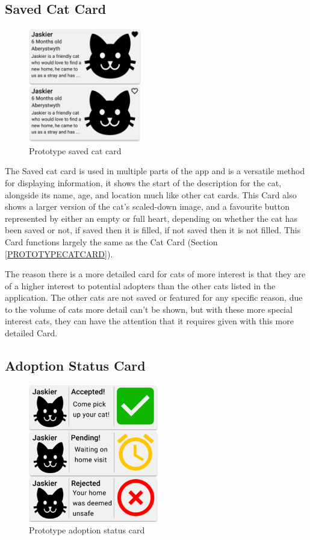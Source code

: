 \subsection{Saved Cat Card} \label{PROTOTYPESAVEDCATCARD}

\begin{figure} [htbp!]
    \centering
    \includegraphics[height=5cm]{Images/PrototypeSavedCatCard.png}
    \caption{Prototype saved cat card}
    \label{fig:prototype_saved_cat_card}
\end{figure}

The Saved cat card is used in multiple parts of the app and is a versatile method for displaying information, it shows the start of the description for the cat, alongside its name, age, and location much like other cat cards. This \gls{Card} also shows a larger version of the cat's scaled-down image, and a favourite button represented by either an empty or full heart, depending on whether the cat has been saved or not, if saved then it is filled, if not saved then it is not filled. This \gls{Card} functions largely the same as the Cat Card (Section \ref{PROTOTYPECATCARD}).

The reason there is a more detailed card for cats of more interest is that they are of a higher interest to potential adopters than the other cats listed in the application. The other cats are not saved or featured for any specific reason, due to the volume of cats more detail can't be shown, but with these more special interest cats, they can have the attention that it requires given with this more detailed \gls{Card}.

\subsection{Adoption Status Card} \label{PROTOTYPEADOPTIONSTATUSCARD}

\begin{figure} [htbp!]
    \centering
    \includegraphics[height=6cm]{Images/PrototypeAdoptionCards.png}
    \caption{Prototype adoption status card}
    \label{fig:prototype_adoption_status_card}
\end{figure}

